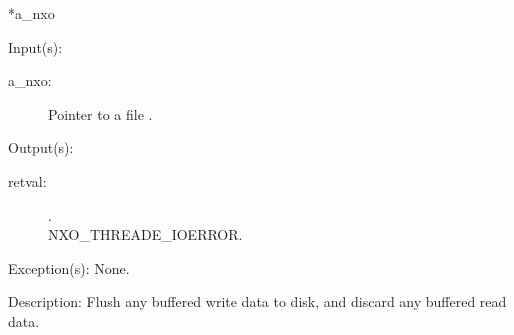 \begin{capi}
{{*a\_nxo}}
	\begin{capilist}
	\item[Input(s): ]
		\begin{description}\item[]
		\item[a\_nxo: ]
			Pointer to a file .
		\end{description}
	\item[Output(s): ]
		\begin{description}\item[]
		\item[retval: ]
			\begin{description}\item[]
			\item[.]
			\item[
				{NXO_THREADE_IOERROR}.]
			\end{description}
		\end{description}
	\item[Exception(s): ] None.
	\item[Description: ]
		Flush any buffered write data to disk, and discard any buffered
		read data.
	\end{capilist}
\end{capi}
